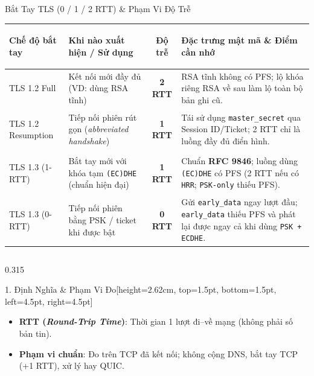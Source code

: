 \documentclass[aspectratio=169, 10pt]{beamer}
\begin{document}
\begin{frame}{Bắt Tay TLS (0 / 1 / 2 RTT) \& Phạm Vi Độ Trễ}
	\centering
	\fontsize{6.2pt}{7.8pt}\selectfont
	\renewcommand{\arraystretch}{1.05}
	\setlength{\tabcolsep}{4.0pt}
	\begin{tabularx}{\textwidth}{>{\leavevmode\color{uetblue}\bfseries\raggedright\arraybackslash}p{2.35cm} >{\raggedright\arraybackslash}p{3.45cm} c >{\raggedright\arraybackslash}X}
		\toprule
		\rowcolor{uetaccentbg}
		Chế độ bắt tay & \textbf{\color{uetblue}Khi nào xuất hiện / Sử dụng} & \textbf{\color{uetblue}Độ trễ} & \textbf{\color{uetblue}Đặc trưng mật mã \& Điểm cần nhớ} \\
		\midrule
		TLS 1.2 Full & Kết nối mới đầy đủ (VD: dùng RSA tĩnh) & \textbf{\color{uetgray}2 RTT} & RSA tĩnh không có PFS; lộ khóa riêng RSA về sau làm lộ toàn bộ bản ghi cũ. \\
		\rowcolor{uetlightgray}
		TLS 1.2 Resumption & Tiếp nối phiên rút gọn (\textit{abbreviated handshake}) & \textbf{\color{uetblue}1 RTT} & Tái sử dụng \texttt{master\_secret} qua Session ID/Ticket; 2 RTT chỉ là luồng đầy đủ điển hình. \\
		TLS 1.3 (1-RTT) & Bắt tay mới với khóa tạm \texttt{(EC)DHE} (chuẩn hiện đại) & \textbf{\color{uetblue}1 RTT} & Chuẩn \textbf{RFC 9846}; luồng dùng \texttt{(EC)DHE} có PFS (2 RTT nếu có \texttt{HRR}; \texttt{PSK-only} thiếu PFS). \\
		\rowcolor{uetlightgray}
		TLS 1.3 (0-RTT) & Tiếp nối phiên bằng PSK / ticket khi được bật & \textbf{\color{uetdarkgreen}0 RTT} & Gửi \texttt{early\_data} ngay lượt đầu; \texttt{early\_data} thiếu PFS và phát lại được ngay cả khi dùng \texttt{PSK + ECDHE}. \\
		\bottomrule
	\end{tabularx}
	\vspace{0.08cm}

	\begin{columns}[T]
		\begin{column}{0.315\textwidth}
			\begin{accentcard}[uetblue]{1. Định Nghĩa \& Phạm Vi Đo}[height=2.62cm, top=1.5pt, bottom=1.5pt, left=4.5pt, right=4.5pt]
				\setlength{\leftmargini}{8pt}
				\begin{itemize}\setlength{\itemsep}{1.2pt}\setlength{\topsep}{0pt}\fontsize{6.1pt}{7.5pt}\selectfont
					\item \textbf{RTT (\textit{Round-Trip Time})}: Thời gian 1 lượt đi--về mạng (không phải số bản tin).
					\item \textbf{Phạm vi chuẩn}: Đo trên TCP đã kết nối; không cộng DNS, bắt tay TCP (+1 RTT), xử lý hay QUIC.
				\end{itemize}
			\end{accentcard}
		\end{column}


\end{columns}
\end{frame}
\end{document}
